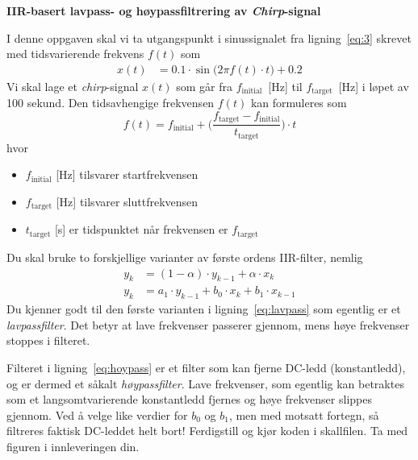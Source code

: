 \item
{\bf IIR-basert lavpass- og høypassfiltrering av {\it Chirp}-signal}

 I denne oppgaven skal vi ta utgangspunkt i sinussignalet fra
 ligning~\eqref{eq:3}  skrevet med tidsvarierende frekvens $f(t)$ som
\begin{align}
  x(t)  &= 0.1{\cdot}\sin\bigl(2 \pi f(t) {\cdot}t\bigr) + 0.2
\end{align}
Vi skal lage et  {\it chirp}-signal $x(t)$
som går fra $f_{\text{initial}}$~[Hz] til
$f_{\text{target}}$~[Hz] i løpet av 100 sekund.
Den tidsavhengige frekvensen $f(t)$ kan formuleres som
\begin{equation}
  \label{eq:1f}
  f(t) =
  f_{\text{initial}}+\Biggl(\frac{f_{\text{target}}-f_{\text{initial}}}{t_{\text{target}}}\Biggl)
  \cdot t
\end{equation}
hvor
\begin{itemize}
      \setlength\itemsep{0mm}
\item  $f_{\text{initial}}$ [Hz] tilsvarer startfrekvensen 
\item  $f_{\text{target}}$ [Hz] tilsvarer sluttfrekvensen
\item  $t_{\text{target}}$ [s] er tidspunktet når frekvensen er
  $f_{\text{target}}$ 
\end{itemize}

Du skal bruke to forskjellige varianter av første ordens IIR-filter, nemlig
  \begin{align}
 y_{k} &= (1-\alpha)  {\cdot}y_{k-1} +  \alpha {\cdot}x_{k}\label{eq:lavpass}\\
 y_{k} &= a_{1}  {\cdot}y_{k-1} +  b_{0}{\cdot}x_{k} + b_{1}{\cdot}x_{k-1}\label{eq:hoypass}
\end{align}
Du kjenner godt til den første varianten i ligning~\eqref{eq:lavpass} som egentlig er et
{\it lavpassfilter}. Det betyr at lave frekvenser passerer gjennom, mens høye frekvenser
stoppes i filteret.

Filteret i ligning~\eqref{eq:hoypass} er et filter som kan
fjerne DC-ledd (konstantledd), og er dermed et såkalt {\it
  høypassfilter}. Lave frekvenser, som egentlig kan betraktes som et
langsomtvarierende konstantledd fjernes og høye frekvenser slippes
gjennom. Ved å velge like verdier for 
$b_{0}$ og $b_{1}$, men med motsatt fortegn, så filtreres faktisk
DC-leddet helt bort!
Ferdigstill og kjør koden i skallfilen. Ta med figuren i innleveringen din.

